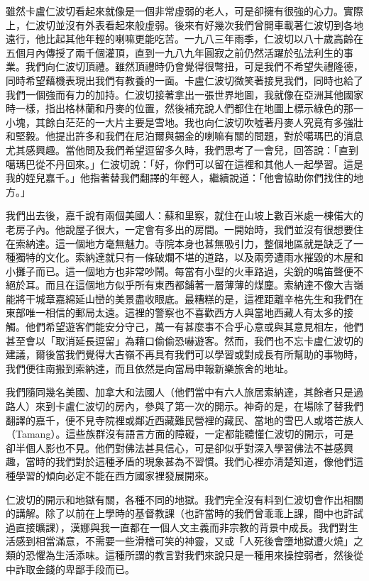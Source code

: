 雖然卡盧仁波切看起來就像是一個非常虛弱的老人，可是卻擁有很強的心力。實際上，仁波切並沒有外表看起來般虛弱。後來有好幾次我們曾開車載著仁波切到各地遠行，他比起其他年輕的喇嘛更能吃苦。一九八三年雨季，仁波切以八十歲高齡在五個月內傳授了兩千個灌頂，直到一九八九年圓寂之前仍然活躍於弘法利生的事業。我們向仁波切頂禮。雖然頂禮時仍會覺得很彆扭，可是我們不希望失禮隆德，同時希望藉機表現出我們有教養的一面。卡盧仁波切微笑著接見我們，同時也給了我們一個強而有力的加持。仁波切接著拿出一張世界地圖，我就像在亞洲其他國家時一樣，指出格林蘭和丹麥的位置，然後補充說人們都住在地圖上標示綠色的那一小塊，其餘白茫茫的一大片主要是雪地。我也向仁波切吹噓著丹麥人究竟有多強壯和堅毅。他提出許多和我們在尼泊爾與錫金的喇嘛有關的問題，對於噶瑪巴的消息尤其感興趣。當他問及我們希望逗留多久時，我們思考了一會兒，回答說：「直到噶瑪巴從不丹回來。」仁波切說：「好，你們可以留在這裡和其他人一起學習。這是我的姪兒嘉千。」他指著替我們翻譯的年輕人，繼續說道：「他會協助你們找住的地方。」

我們出去後，嘉千說有兩個美國人：蘇和里察，就住在山坡上數百米處一棟偌大的老房子內。他說屋子很大，一定會有多出的房間。一開始時，我們並沒有很想要住在索納達。這一個地方毫無魅力。寺院本身也甚無吸引力，整個地區就是缺乏了一種獨特的文化。索納達就只有一條破爛不堪的道路，以及兩旁遭雨水摧毀的木屋和小攤子而已。這一個地方也非常吵鬧。每當有小型的火車路過，尖銳的鳴笛聲便不絕於耳。而且在這個地方似乎所有東西都鋪著一層薄薄的煤塵。索納達不像大吉嶺能將干城章嘉綿延山巒的美景盡收眼底。最糟糕的是，這裡距離辛格先生和我們在東部唯一相信的郵局太遠。這裡的警察也不喜歡西方人與當地西藏人有太多的接觸。他們希望遊客們能安分守己，萬一有甚麼事不合乎心意或與其意見相左，他們甚至會以「取消延長逗留」為藉口偷偷恐嚇遊客。然而，我們也不忘卡盧仁波切的建議，爾後當我們覺得大吉嶺不再具有我們可以學習或對成長有所幫助的事物時，我們便往南搬到索納達，而且依然是向當局申報新樂旅舍的地址。

我們隨同幾名美國、加拿大和法國人（他們當中有六人旅居索納達，其餘者只是過路人）來到卡盧仁波切的房內，參與了第一次的開示。神奇的是，在場除了替我們翻譯的嘉千，便不見寺院裡或鄰近西藏難民營裡的藏民、當地的雪巴人或塔芒族人（Tamang）。這些族群沒有語言方面的障礙，一定都能聽懂仁波切的開示，可是卻半個人影也不見。他們對佛法甚具信心，可是卻似乎對深入學習佛法不甚感興趣，當時的我們對於這種矛盾的現象甚為不習慣。我們心裡亦清楚知道，像他們這種學習的傾向必定不能在西方國家裡發展開來。

仁波切的開示和地獄有關，各種不同的地獄。我們完全沒有料到仁波切會作出相關的講解。除了以前在上學時的基督教課（也許當時的我們曾乖乖上課，間中也許試過直接曠課），漢娜與我一直都在一個人文主義而非宗教的背景中成長。我們對生活感到相當滿意，不需要一些滑稽可笑的神靈，又或「人死後會墮地獄遭火燒」之類的恐懼為生活添味。這種所謂的教言對我們來說只是一種用來操控弱者，然後從中詐取金錢的卑鄙手段而已。

